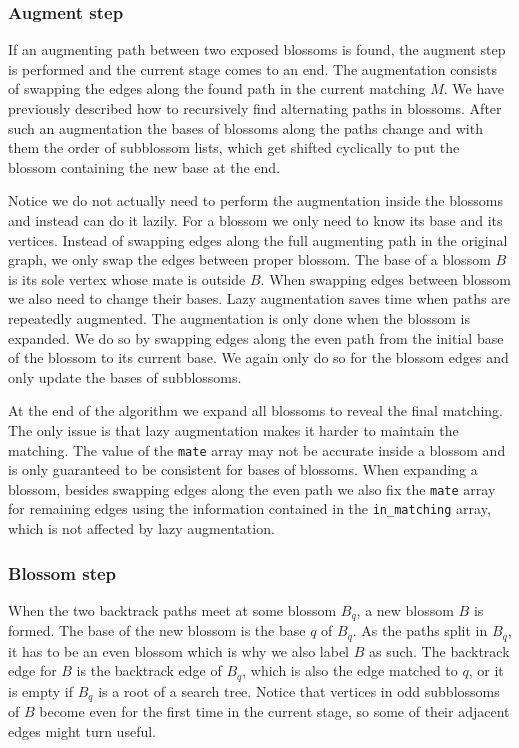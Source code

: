 \subsubsection*{Augment step}

If an augmenting path between two exposed blossoms is found, the augment step is performed and the current stage comes to an end. The augmentation consists of swapping the edges along the found path in the current matching $M$. We have previously described how to recursively find alternating paths in blossoms. After such an augmentation the bases of blossoms along the paths change and with them the order of subblossom lists, which get shifted cyclically to put the blossom containing the new base at the end. 

Notice we do not actually need to perform the augmentation inside the blossoms and instead can do it lazily. For a blossom we only need to know its base and its vertices. Instead of swapping edges along the full augmenting path in the original graph, we only swap the edges between proper blossom. The base of a blossom $B$ is its sole vertex whose mate is outside $B$. When swapping edges between blossom we also need to change their bases. Lazy augmentation saves time when paths are repeatedly augmented. The augmentation is only done when the blossom is expanded. We do so by swapping edges along the even path from the  initial base of the blossom to its current base. We again only do so for the blossom edges and only update the bases of subblossoms.

At the end of the algorithm we expand all blossoms to reveal the final matching. The only issue is that lazy augmentation makes it harder to maintain the matching. The value of the \texttt{mate} array may not be accurate inside a blossom and is only guaranteed to be consistent for bases of blossoms.  When expanding a blossom, besides swapping edges along the even path we also fix the \texttt{mate} array for remaining edges using the information contained in the \texttt{in\_matching} array, which is not affected by lazy augmentation.

\subsubsection*{Blossom step}

When the two backtrack paths meet at some blossom $B_q$, a new blossom $B$ is formed. The base of the new blossom is the base $q$ of $B_q$. As the paths split in $B_q$, it has to be an even blossom which is why we also label $B$ as such. The backtrack edge for $B$ is the backtrack edge of $B_q$, which is also the edge matched to $q$, or it is empty if $B_q$ is a root of a search tree. Notice that vertices in odd subblossoms of $B$ become even for the first time in the current stage, so some of their adjacent edges might turn useful.

